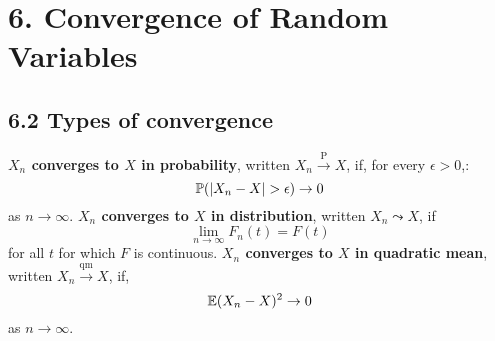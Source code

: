 \section*{6. Convergence of Random Variables}\label{convergence-of-random-variables}

\subsection*{6.2 Types of convergence}\label{types-of-convergence}
\textbf{\(X_{n}\) converges to \(X\) in probability}, written
\(X_{n} \xrightarrow{\textrm{P}} X\), if, for every \(\epsilon > 0\),:
\[
\operatorname{\mathbb{P}}( |X_{n} - X| > \epsilon ) \rightarrow 0
\]
as \(n \rightarrow \infty\).
\textbf{\(X_{n}\) converges to \(X\) in distribution}, written
\(X_{n} \leadsto X\), if
\[
\lim _{n \rightarrow \infty} F_{n}(t) = F(t)
\]
for all \(t\) for which \(F\) is continuous.
\textbf{\(X_{n}\) converges to \(X\) in quadratic mean}, written
\(X_{n} \xrightarrow{\text{qm}} X\), if,
\[
\operatorname{\mathbb{E}}(X_{n} - X)^{2} \rightarrow 0
\]
as \(n \rightarrow \infty\).

